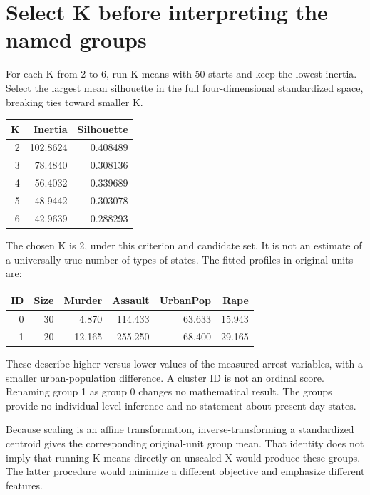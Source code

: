 \section{Select K before interpreting the named groups}
For each K from 2 to 6, run K-means with 50 starts and keep the lowest inertia. Select the largest mean silhouette in the full
four-dimensional standardized space, breaking ties toward smaller K.
\begin{center}\begin{tabular}{rrr}\toprule
K&Inertia&Silhouette\\\midrule
2&102.8624&0.408489\\3&78.4840&0.308136\\4&56.4032&0.339689\\
5&48.9442&0.303078\\6&42.9639&0.288293\\\bottomrule\end{tabular}\end{center}
The chosen K is 2, under this criterion and candidate set. It is not an estimate of a universally true number of types of states.
The fitted profiles in original units are:
\begin{center}\begin{tabular}{rrrrrr}\toprule
ID&Size&Murder&Assault&UrbanPop&Rape\\\midrule
0&30&4.870&114.433&63.633&15.943\\
1&20&12.165&255.250&68.400&29.165\\\bottomrule\end{tabular}\end{center}
These describe higher versus lower values of the measured arrest variables, with a smaller urban-population difference.
A cluster ID is not an ordinal score. Renaming group 1 as group 0 changes no mathematical result.
The groups provide no individual-level inference and no statement about present-day states.

Because scaling is an affine transformation, inverse-transforming a standardized centroid gives the corresponding original-unit group mean.
That identity does not imply that running K-means directly on unscaled X would produce these groups.
The latter procedure would minimize a different objective and emphasize different features.

